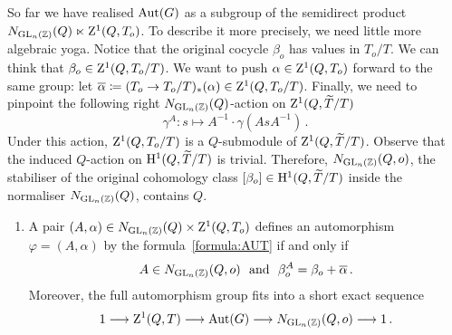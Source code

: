   So far  we have realised $\operatorname{Aut} (G)$ as a subgroup of the semidirect product
  $N_{\operatorname{GL}_n ({\mathbb Z})}(Q) \ltimes \mathrm{Z}^1 (Q,T_o)$. To describe it more precisely,
  we need little more algebraic yoga. Notice that the original cocycle $\beta_o$ has values in $T_o/T$.
  We can think that $\beta_o \in \mathrm{Z}^1 (Q, T_o/T)$.
  We want to push $\alpha \in \mathrm{Z}^1 (Q, T_o)$ forward to the same group:
  let $\overline{\alpha} \coloneqq (T_o \to T_o/T)_\ast (\alpha) \in \mathrm{Z}^1 (Q, T_o/T)$.
        Finally, we need to pinpoint the following right $N_{\operatorname{GL}_n ({\mathbb Z})}(Q)$-action on $\mathrm{Z}^1 (Q, \widetilde{T}/T)$
    \[ \gamma^A : s \mapsto A^{-1} \cdot \gamma (AsA^{-1}) \, . \]
Under this action, $\mathrm{Z}^1 (Q, T_o/T)$ is a $Q$-submodule of $\mathrm{Z}^1 (Q, \widetilde{T}/T)$.
Observe that the induced $Q$-action on $\mathrm{H}^1 (Q, \widetilde{T}/T)$ is trivial.
Therefore,  $N_{\operatorname{GL}_n ({\mathbb Z})}(Q, o)$,
the stabiliser of the original cohomology class $[\beta_o]\in \mathrm{H}^1 (Q,\widetilde{T}/T)$ inside the normaliser $N_{\operatorname{GL}_n ({\mathbb Z})}(Q)$,
contains $Q$.
\begin{enumerate}[resume, label=\textnormal{(\Roman*)}]
\item
  A pair $(A,\alpha)\in N_{\operatorname{GL}_n ({\mathbb Z})}(Q)\times \mathrm{Z}^1 (Q,T_o)$ defines an automorphism $\varphi = (A,\alpha)$ by the formula~\eqref{formula:AUT}
  if and only if
  \[A \in N_{\GL_n (\bZ)}(Q, o) \ \mbox{ and } \ \beta_o^A = \beta_o + \overline{\alpha} \, . \]
   Moreover,
    the full automorphism group fits into a short exact sequence 
    \begin{equation} \label{Physics_AutSequence}
      1 \longrightarrow \mathrm{Z}^1 (Q,T) \longrightarrow \operatorname{Aut} (G) \longrightarrow   N_{\operatorname{GL}_n ({\mathbb Z})}(Q,o) \longrightarrow 1\, .
    \end{equation} 
\end{enumerate}

